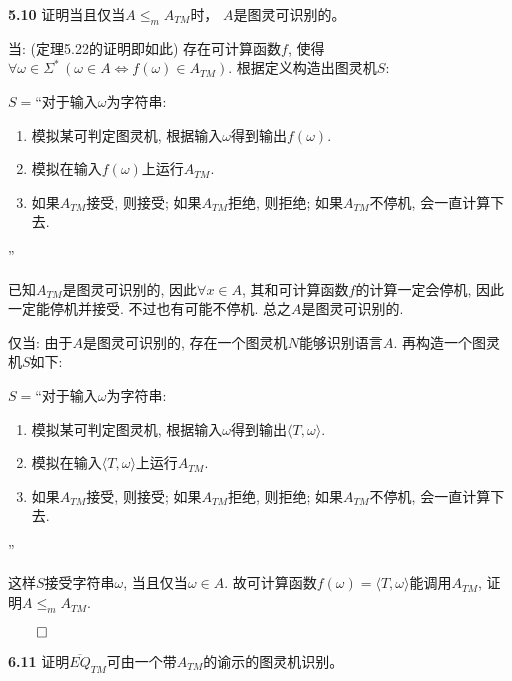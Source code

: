 \documentclass[UTF8]{report}
\newcommand{\problem}[1]{{\setlength{\parskip}{10pt}\noindent \bf{#1}}}
\renewenvironment{proof}{{\setlength{\parskip}{7pt}\noindent\hskip 2em \bf 证明 \quad}}{\hfill$\qed$\par}
\begin{document}
\problem{5.10} 证明当且仅当$A \leq_m A_{TM}$时， $A$是图灵可识别的。

\begin{proof}
    当: (定理5.22的证明即如此) 存在可计算函数$f$, 使得$\forall \omega \in \Sigma^*\, (\omega \in A \Leftrightarrow f(\omega) \in A_{TM})$. 根据定义构造出图灵机$S$:
    
    $S=$``对于输入$\omega$为字符串:
    \begin{enumerate}
        \item 模拟某可判定图灵机, 根据输入$\omega$得到输出$f(\omega)$.
        \item 模拟在输入$f(\omega)$上运行$A_{TM}$.
        \item 如果$A_{TM}$接受, 则接受; 如果$A_{TM}$拒绝, 则拒绝; 如果$A_{TM}$不停机, 会一直计算下去.
    \end{enumerate}
    ''

    已知$A_{TM}$是图灵可识别的, 因此$\forall x\in A$, 其和可计算函数$f$的计算一定会停机, 因此一定能停机并接受. 不过也有可能不停机. 总之$A$是图灵可识别的.

    仅当: 由于$A$是图灵可识别的, 存在一个图灵机$N$能够识别语言$A$. 再构造一个图灵机$S$如下:

    $S=$``对于输入$\omega$为字符串:
    \begin{enumerate}
        \item 模拟某可判定图灵机, 根据输入$\omega$得到输出$\langle T, \omega \rangle$.
        \item 模拟在输入$\langle T, \omega \rangle$上运行$A_{TM}$.
        \item 如果$A_{TM}$接受, 则接受; 如果$A_{TM}$拒绝, 则拒绝; 如果$A_{TM}$不停机, 会一直计算下去.
    \end{enumerate}
    ''

    这样$S$接受字符串$\omega$, 当且仅当$\omega \in A$. 故可计算函数$f(\omega) = \langle T, \omega \rangle$能调用$A_{TM}$, 证明$A \leq_m A_{TM}$.

\end{proof}




\problem{6.11} 证明$\overline{EQ}_{TM}$可由一个带$A_{TM}$的谕示的图灵机识别。
\end{document}

